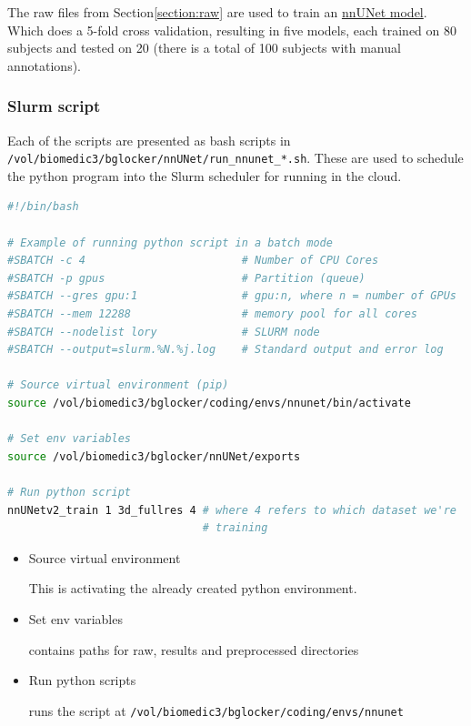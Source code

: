 \documentclass[11pt]{article}
\begin{document}
The raw files from Section\ref{section:raw} are used to train an \href{https://github.com/MIC-DKFZ/nnUNet}{nnUNet model}. Which does a 5-fold cross validation, resulting in five models, each trained on 80 subjects and tested on 20 (there is a total of 100 subjects with manual annotations).

\subsubsection{Slurm script}

Each of the scripts are presented as bash scripts in \texttt{/vol/biomedic3/bglocker/nnUNet/run\_nnunet\_*.sh}. These are used to schedule the python program into the Slurm scheduler for running in the cloud.

\begin{lstlisting}[language=bash]
#!/bin/bash

# Example of running python script in a batch mode
#SBATCH -c 4                        # Number of CPU Cores
#SBATCH -p gpus                     # Partition (queue)
#SBATCH --gres gpu:1                # gpu:n, where n = number of GPUs
#SBATCH --mem 12288                 # memory pool for all cores
#SBATCH --nodelist lory          	# SLURM node
#SBATCH --output=slurm.%N.%j.log    # Standard output and error log

# Source virtual environment (pip)
source /vol/biomedic3/bglocker/coding/envs/nnunet/bin/activate

# Set env variables
source /vol/biomedic3/bglocker/nnUNet/exports

# Run python script
nnUNetv2_train 1 3d_fullres 4 # where 4 refers to which dataset we're 
                              # training
\end{lstlisting}

\begin{itemize}
    \item Source virtual environment
    
    This is activating the already created python environment. 

    \item Set env variables
    
    contains paths for raw, results and preprocessed directories

    \item Run python scripts 
    
    runs the script at \texttt{/vol/biomedic3/bglocker/coding/envs/nnunet}
\end{itemize}
\end{document}
